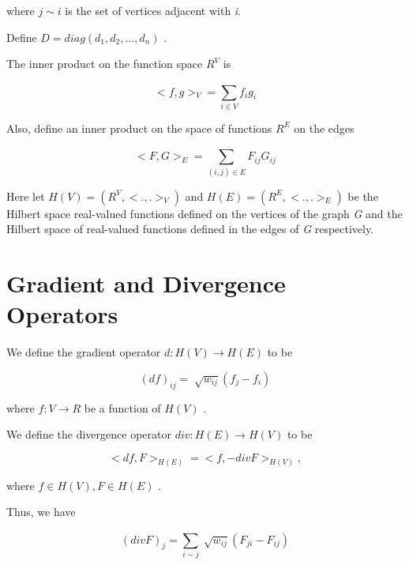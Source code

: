 where  \( j \sim i \)  is the set of vertices adjacent with \textit{i}.

Define  \( D=diag \left( d_{1},d_{2}, \ldots ,d_{n} \right)  \) .

The inner product on the function space  \( R^{V} \)  is


\begin{equation}
<f,g>_{V}= \sum _{i \in V}^{}f_{i}g_{i}
\end{equation}


Also, define an inner product on the space of functions  \( R^{E} \)  on the edges


\begin{equation}
<F,G>_{E} = \sum _{ \left( i,j \right)  \in E}^{}F_{ij}G_{ij}
\end{equation}


Here let  \( H \left( V \right) = \left( R^{V},<.,.>_{V} \right)  \)  and  \( H \left( E \right) = \left( R^{E},<.,.>_{E} \right)  \)  be the Hilbert space real-valued functions defined on the vertices of the graph \textit{G} and the Hilbert space of real-valued functions defined in the edges of \textit{G} respectively.


\section{Gradient and Divergence Operators}

We define the gradient operator  \( d:H \left( V \right)  \rightarrow H \left( E \right)  \)  to be\par


\begin{equation}
\left( df \right) _{ij}=\sqrt[]{w_{ij}} \left( f_{j}-f_{i} \right)
\end{equation}


where  \( f:V \rightarrow R \)  be a function of  \( H \left( V \right)  \) .

We define the divergence operator  \( div:H \left( E \right)  \rightarrow H \left( V \right)  \)  to be


\begin{equation}
<df,F>_{H \left( E \right) }=<f,-divF>_{H \left( V \right) },
\end{equation}


where  \( f \in H \left( V \right) ,F \in H \left( E \right)  \) .

Thus, we have 


\begin{equation}
\left( divF \right) _{j}= \sum _{i \sim j}^{}\sqrt[]{w_{ij}} \left( F_{ji}-F_{ij} \right)
\end{equation}



